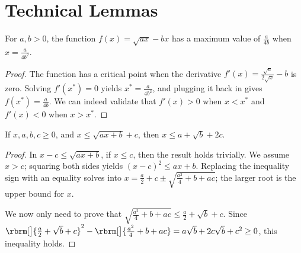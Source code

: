 \section{Technical Lemmas}

\begin{lemma}\label{lem:sqrt-func}
    For $a,b>0$, the function $f(x)=\sqrt{ax}-bx$ has a maximum value of $\frac{a}{4b}$ when $x=\frac{a}{4b^2}$.
\end{lemma}
\begin{proof}
    The function has a critical point when the derivative $f'(x)=\frac{\sqrt{a}}{2\sqrt{x}}-b$ is zero. Solving $f'(x^*)=0$ yields $x^*=\frac{a}{4b^2}$, and plugging it back in gives $f(x^*)=\frac{a}{4b}$. We can indeed validate that $f'(x)>0$ when $x<x^*$ and $f'(x)<0$ when $x>x^*$.
\end{proof}

\begin{lemma}\label{lem:self-bound}
    If $x,a,b,c\geq0$, and $x\leq \sqrt{a x + b} + c$, then $x\leq a+\sqrt{b}+2c$.
\end{lemma}
\begin{proof}
    In $x-c\leq \sqrt{ax+b}$, if $x\leq c$, then the result holds trivially. We assume $x>c$; squaring both sides yields $(x-c)^2\leq ax+b$. Replacing the inequality sign with an equality solves into $x=\frac a2+c\pm\sqrt{\frac{a^2}{4}+b+ac}$; the larger root is the upper bound for $x$.
    
    We now only need to prove that $\sqrt{\frac{a^2}{4}+b+ac}\leq \frac a2+\sqrt{b}+c$. Since $\rbrm[\big]{\frac a2+\sqrt{b}+c}^2-\rbrm[\big]{\frac{a^2}{4}+b+ac}=a\sqrt{b}+2c\sqrt{b}+c^2\geq 0$, this inequality holds.
\end{proof}

